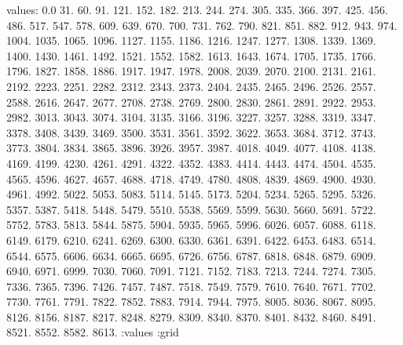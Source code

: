 values: 0.0 31. 60. 91. 121. 152. 182. 213. 244. 274. 305. 335. 366. 397. 425. 456. 486. 517. 547. 578. 609. 639. 670. 700. 731. 762. 790. 821. 851. 882. 912. 943. 974. 1004. 1035. 1065. 1096. 1127. 1155. 1186. 1216. 1247. 1277. 1308. 1339. 1369. 1400. 1430. 1461. 1492. 1521. 1552. 1582. 1613. 1643. 1674. 1705. 1735. 1766. 1796. 1827. 1858. 1886. 1917. 1947. 1978. 2008. 2039. 2070. 2100. 2131. 2161. 2192. 2223. 2251. 2282. 2312. 2343. 2373. 2404. 2435. 2465. 2496. 2526. 2557. 2588. 2616. 2647. 2677. 2708. 2738. 2769. 2800. 2830. 2861. 2891. 2922. 2953. 2982. 3013. 3043. 3074. 3104. 3135. 3166. 3196. 3227. 3257. 3288. 3319. 3347. 3378. 3408. 3439. 3469. 3500. 3531. 3561. 3592. 3622. 3653. 3684. 3712. 3743. 3773. 3804. 3834. 3865. 3896. 3926. 3957. 3987. 4018. 4049. 4077. 4108. 4138. 4169. 4199. 4230. 4261. 4291. 4322. 4352. 4383. 4414. 4443. 4474. 4504. 4535. 4565. 4596. 4627. 4657. 4688. 4718. 4749. 4780. 4808. 4839. 4869. 4900. 4930. 4961. 4992. 5022. 5053. 5083. 5114. 5145. 5173. 5204. 5234. 5265. 5295. 5326. 5357. 5387. 5418. 5448. 5479. 5510. 5538. 5569. 5599. 5630. 5660. 5691. 5722. 5752. 5783. 5813. 5844. 5875. 5904. 5935. 5965. 5996. 6026. 6057. 6088. 6118. 6149. 6179. 6210. 6241. 6269. 6300. 6330. 6361. 6391. 6422. 6453. 6483. 6514. 6544. 6575. 6606. 6634. 6665. 6695. 6726. 6756. 6787. 6818. 6848. 6879. 6909. 6940. 6971. 6999. 7030. 7060. 7091. 7121. 7152. 7183. 7213. 7244. 7274. 7305. 7336. 7365. 7396. 7426. 7457. 7487. 7518. 7549. 7579. 7610. 7640. 7671. 7702. 7730. 7761. 7791. 7822. 7852. 7883. 7914. 7944. 7975. 8005. 8036. 8067. 8095. 8126. 8156. 8187. 8217. 8248. 8279. 8309. 8340. 8370. 8401. 8432. 8460. 8491. 8521. 8552. 8582. 8613. :values
:grid
